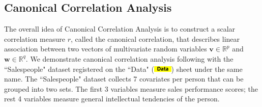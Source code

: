 \documentclass[article]{jss}
\numberwithin{equation}{subsection}
\newcommand{\shtData}{``Data" (\includegraphics[height=8pt, keepaspectratio=true]{DataSheetTab_png}) }
\begin{document}
        \subsection[egCCA]{Canonical Correlation Analysis}
        The overall idea of Canonical Correlation Analysis \citep{hotelling1936relations} is to construct a scalar correlation measure $r$, called the canonical correlation, that describes linear association between two vectors of multivariate random variables $\textbf{v}\in\mathbb{R}^p$ and $\textbf{w}\in\mathbb{R}^q$. We demonstrate canonical correlation analysis following \cite{anderson2003introMVA3e} with the ``Salespeople" dataset registered on the \shtData sheet under the same name. The ``Salespeople" dataset collects 7 covariates per person that can be grouped into two sets. The first 3 variables measure sales performance scores; the rest 4 variables measure general intellectual tendencies of the person.
        
\end{document}
